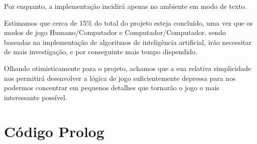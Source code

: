 \documentclass[15pt,a4paper]{article}
\begin{document}
Por enquanto, a implementação incidirá apenas no ambiente em modo de texto.

Estimamos que cerca de 15\% do total do projeto esteja concluído, uma vez que os modos de jogo Humano/Computador e Computador/Computador, sendo baseadas na implementação de algoritmos de inteligência artificial, irão necessitar de mais investigação, e por conseguinte mais tempo dispendido.

Olhando otimisticamente para o projeto, achamos que a sua relativa simplicidade nos permitirá desenvolver a lógica de jogo suficientemente depressa para nos podermos concentrar em pequenos detalhes que tornarão o jogo o mais interessante possível.



\clearpage

\renewcommand\refname{Bibliografia}



\nocite{breakSite}
\nocite{tut1}
\nocite{tut2}


\newpage

\appendix
\section{Código Prolog}

\end{document}

